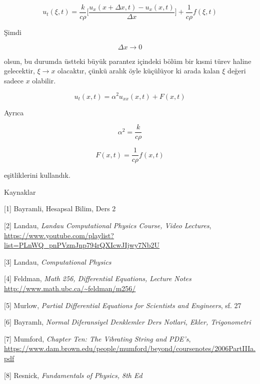 \documentclass[12pt,fleqn]{article}\usepackage{../../common}
\begin{document}
$$
u_t(\xi,t) =  \frac{k}{c\rho}
\bigg[
\frac{u_x(x+\Delta x,t) - u_x(x,t)} {\Delta x}
\bigg]
+ \frac{ 1}{c\rho}f(\xi,t)
$$

Şimdi 

$$ \Delta x \to 0 $$

olsun, bu durumda üstteki büyük parantez içindeki bölüm bir kısmi türev
haline gelecektir, $\xi \to x$ olacaktır, çünkü aralık öyle küçülüyor ki
arada kalan $\xi$ değeri sadece $x$ olabilir.

$$ u_t(x,t) = \alpha^2u_{xx}(x,t) + F(x,t) $$

Ayrıca

$$ \alpha^2 = \frac{k}{c\rho} $$

$$ F(x,t) = \frac{1}{c\rho}f(x,t) $$

eşitliklerini kullandık. 

Kaynaklar

[1] Bayramli, Hesapsal Bilim, Ders 2 

[2] Landau, {\em Landau Computational Physics Course, Video Lectures},
    \url{https://www.youtube.com/playlist?list=PLnWQ_pnPVzmJnp794rQXIcwJIjwy7Nb2U}

[3] Landau, {\em Computational Physics}

[4] Feldman, {\em Math 256, Differential Equations, Lecture Notes}
    \url{http://www.math.ubc.ca/~feldman/m256/}

[5] Murlow, {\em Partial Differential Equations for Scientists and Engineers}, sf. 27

[6] Bayramlı, {\em Normal Diferansiyel Denklemler Ders Notlari, Ekler, Trigonometri}

[7] Mumford, {\em Chapter Ten: The Vibrating String and PDE's},
    \url{https://www.dam.brown.edu/people/mumford/beyond/coursenotes/2006PartIIIa.pdf}

[8] Resnick, {\em Fundamentals of Physics, 8th Ed}
    
\end{document}
